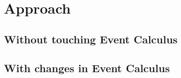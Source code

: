 \section{Approach}\label{sec:approach}

\subsection{Without touching Event Calculus}
\subsection{With changes in Event Calculus}
